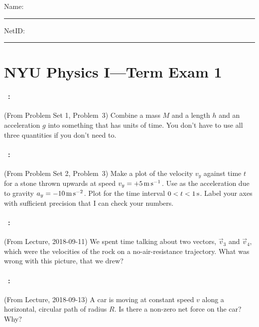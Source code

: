 \documentclass[12pt]{article}
\begin{document}
\noindent
Name: \rule[-1ex]{0.55\textwidth}{0.1pt}
NetID: \rule[-1ex]{0.2\textwidth}{0.1pt}

\section*{NYU Physics I---Term Exam 1}

\paragraph{\problemname~\theproblem:}%
(From Problem Set 1, Problem~3)
Combine a mass $M$ and a length $h$ and an acceleration $g$ into
something that has units of time. You don't have to use all three
quantities if you don't need to.

\vfill

\paragraph{\problemname~\theproblem:}%
(From Problem Set 2, Problem~3)
Make a plot of the velocity $v_y$ against time $t$ for a stone thrown upwards
at speed $v_y = +5\,\mathrm{m}\,\mathrm{s}^{-1}$. Use as the acceleration due to gravity $a_y = -10\,\mathrm{m}\,\mathrm{s}^{-2}$.
Plot for the time interval $0<t<1\,\mathrm{s}$.
Label your axes with sufficient precision that I can check your numbers.

\vfill

\paragraph{\problemname~\theproblem:}%
(From Lecture, 2018-09-11)
We spent time talking about two vectors, $\vec{v}_3$ and $\vec{v}_4$,
which were the velocities of the rock on a no-air-resistance trajectory.
What was wrong with this picture, that we drew?

\vfill

\clearpage
\paragraph{\problemname~\theproblem:}%
(From Lecture, 2018-09-13)
A car is moving at constant speed $v$ along a horizontal, circular path
of radius $R$. Is there a non-zero net force on the car? Why?
\end{document}
